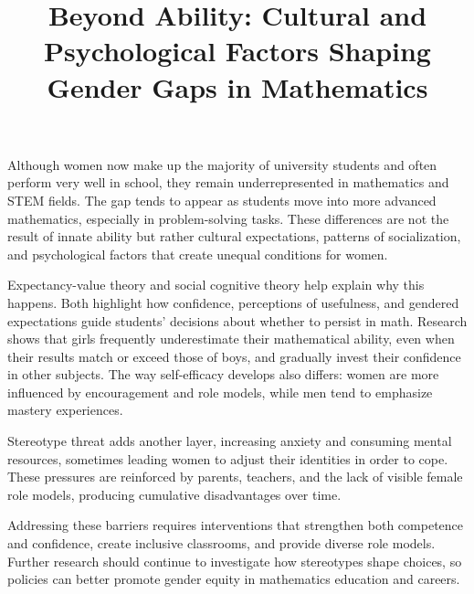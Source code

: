 \documentclass{article}
\title{Beyond Ability: Cultural and Psychological Factors Shaping Gender Gaps in Mathematics}
\date{}
\begin{document}
\maketitle
 Although women now make up the majority of university students and often perform very well in school, they remain underrepresented in mathematics and STEM fields. The gap tends to appear as students move into more advanced mathematics, especially in problem-solving tasks. These differences are not the result of innate ability but rather cultural expectations, patterns of socialization, and psychological factors that create unequal conditions for women.

Expectancy-value theory and social cognitive theory help explain why this happens. Both highlight how confidence, perceptions of usefulness, and gendered expectations guide students’ decisions about whether to persist in math. Research shows that girls frequently underestimate their mathematical ability, even when their results match or exceed those of boys, and gradually invest their confidence in other subjects. The way self-efficacy develops also differs: women are more influenced by encouragement and role models, while men tend to emphasize mastery experiences.

Stereotype threat adds another layer, increasing anxiety and consuming mental resources, sometimes leading women to adjust their identities in order to cope. These pressures are reinforced by parents, teachers, and the lack of visible female role models, producing cumulative disadvantages over time.

Addressing these barriers requires interventions that strengthen both competence and confidence, create inclusive classrooms, and provide diverse role models. Further research should continue to investigate how stereotypes shape choices, so policies can better promote gender equity in mathematics education and careers.   
\end{document}
